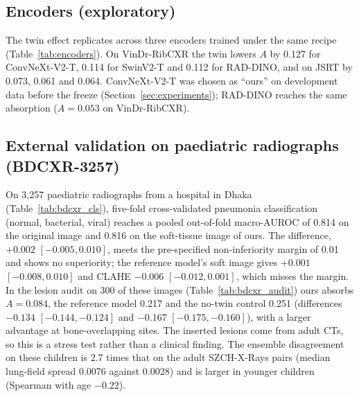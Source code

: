 \subsection{Encoders (exploratory)}
The twin effect replicates across three encoders trained under the same recipe (Table~\ref{tab:encoders}). On VinDr-RibCXR the twin lowers
$A$ by 0.127 for ConvNeXt-V2-T, 0.114 for SwinV2-T and 0.112 for RAD-DINO, and on JSRT by 0.073, 0.061 and 0.064. ConvNeXt-V2-T was chosen
as ``ours'' on development data before the freeze (Section~\ref{sec:experiments}); RAD-DINO reaches the same absorption ($A=0.053$ on
VinDr-RibCXR).
\begin{table}[htbp]
\centering\small
\caption{Twin regulariser per encoder (exploratory): absorption difference to the matched no-twin control and its interaction with bone
overlap.}
\label{tab:encoders}
\end{table}

\subsection{External validation on paediatric radiographs (BDCXR-3257)}
\label{sec:bdcxr}
On 3,257 paediatric radiographs from a hospital in Dhaka (Table~\ref{tab:bdcxr_cls}), five-fold cross-validated pneumonia classification
(normal, bacterial, viral) reaches a pooled out-of-fold macro-AUROC of 0.814 on the original image and 0.816 on the soft-tissue image of
ours. The difference, $+0.002$ $[-0.005,0.010]$, meets the pre-specified non-inferiority margin of 0.01 and shows no superiority; the
reference model's soft image gives $+0.001$ $[-0.008,0.010]$ and CLAHE $-0.006$ $[-0.012,0.001]$, which misses the margin. In the lesion audit
on 300 of these images (Table~\ref{tab:bdcxr_audit}) ours absorbs $A=0.084$, the reference model 0.217 and the no-twin control 0.251
(differences $-0.134$ $[-0.144,-0.124]$ and $-0.167$ $[-0.175,-0.160]$), with a larger advantage at bone-overlapping sites. The inserted
lesions come from adult CTs, so this is a stress test rather than a clinical finding. The ensemble disagreement on these children is 2.7 times
that on the adult SZCH-X-Rays pairs (median lung-field spread 0.0076 against 0.0028) and is larger in younger children (Spearman with age
$-0.22$).
\begin{table}[htbp]
\centering\small
\caption{BDCXR-3257: pneumonia classification (normal, bacterial, viral), five folds over near-duplicate groups $\times$ three seeds;
pooled out-of-fold macro-AUROC, per-fold mean $\pm$ SD and the difference to the original image (group bootstrap).}
\label{tab:bdcxr_cls}
\end{table}
\begin{table}[htbp]
\centering\small
\caption{BDCXR-3257: lesion audit on a fixed class-stratified subset of 300 images (1,800 sites).}
\label{tab:bdcxr_audit}
\end{table}
